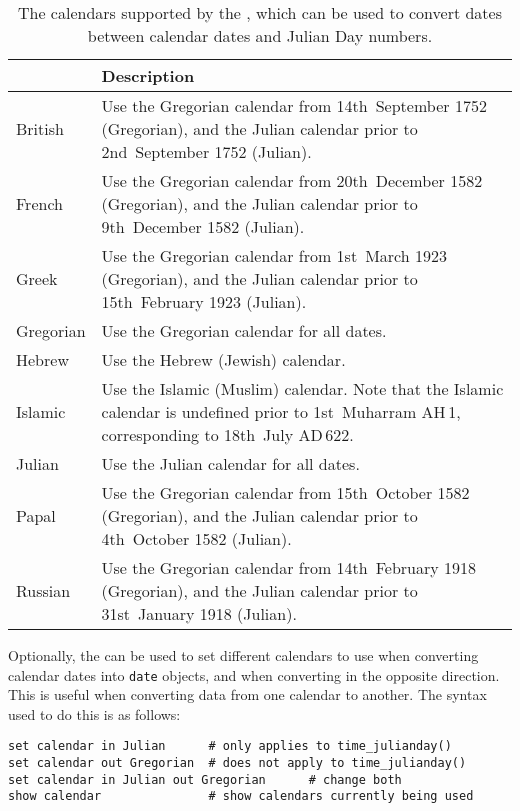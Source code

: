 \begin{table}
\begin{center}
\begin{tabular}{|>{\columncolor{LightGrey}}l|>{\columncolor{LightGrey}}p{9cm}|}
\hline
{\bf Calendar} & {\bf Description} \\
\hline
British &
Use the Gregorian calendar from 14th~September 1752 (Gregorian), and the Julian calendar prior to 2nd~September 1752 (Julian). \\
French &
Use the Gregorian calendar from 20th~December 1582 (Gregorian), and the Julian
calendar prior to 9th~December 1582 (Julian). \\
Greek &
Use the Gregorian calendar from 1st~March 1923 (Gregorian), and the Julian
calendar prior to 15th~February 1923 (Julian). \\
Gregorian &
Use the Gregorian calendar for all dates. \\
Hebrew &
Use the Hebrew (Jewish) calendar. \\
Islamic &
Use the Islamic (Muslim) calendar. Note that the Islamic calendar is undefined prior to 1st~Muharram {\footnotesize AH}\,1, corresponding to 18th~July {\footnotesize AD}\,622. \\
Julian &
Use the Julian calendar for all dates. \\
Papal &
Use the Gregorian calendar from 15th~October 1582 (Gregorian), and the Julian
calendar prior to 4th~October 1582 (Julian). \\
Russian &
Use the Gregorian calendar from 14th~February 1918 (Gregorian), and the Julian
calendar prior to 31st~January 1918 (Julian). \\
\hline
\end{tabular}
\end{center}
\caption{The calendars supported by the , which can be
used to convert dates between calendar dates and Julian Day numbers.}
\label{tab:calendars}
\end{table}

Optionally, the  can be used to set different calendars
to use when converting calendar dates into {\tt date} objects, and when
converting in the opposite direction. This is useful when converting data from
one calendar to another. The syntax used to do this is as follows:
\begin{verbatim}
set calendar in Julian      # only applies to time_julianday()
set calendar out Gregorian  # does not apply to time_julianday()
set calendar in Julian out Gregorian      # change both
show calendar               # show calendars currently being used
\end{verbatim}

